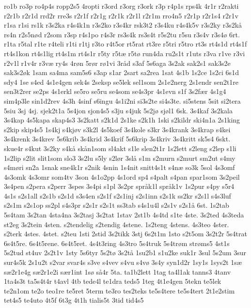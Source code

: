 {ro1b
ro3p
ro4p4s
ropp2s5
4ropti
r3ord
r3org
r3ork
r3p
r4p1s
rps4k
4r1r
r2rakti
r2r1b
r2r1d
rrd2r
rre3s
r2r1f
r2r1g
r2r1k
r2r1l
r2r1m
rro4n5
r2r1p
r2r1s4
r2r1v
r1sa
r1si
rs1k
r3s2ka
r4s4k1n
r3s2ko
r3s4kr
rsk3t2
r3s4ku
r4s4k5v
r3s2ky
r3s2k^^e5
rs4n
r2s5n^^f8d
r2som
r3sp
r4s1po
r4s3r
rs3s4k
rs3s4t
r5s2tu
r5su
r3s4v
r3s4^^f8
6rt.
r1ta
r5tal
r1te
r4teli
r1ti
r1tj
r3to
r4t5or
rt5rat
rt3re
r5tri
r5tro
rt3s
rt4s1d
rt4s1f
rt4s1kon
rt4s1lig
rt4s1m
rt4s1r
r5ty
r5t^^e6
r5t^^f8
run4da
ru2s1t
r1uts
r3va
r1ve
r3vi
r2v1l
r1v4r
r3v^^e6
ry4s
4r^^f8n
5r^^f8r
r^^f81vi
3r^^e5d
s3af
5s6aga
3s2ak
sak2s1
sak3s2e
sak3s2^^f8k
1sam
sa4ma
sam5s6
s3ap
s1ar
2sart
sa2rea
1sat
4s1b
1s2ce
1s2ci
6s1d
sdy4
1se
s4ed
4s1e4gen
sek4s
2seksp
se5lek
sel1som
2s1e2nerg
2s1endr
sen2t1re
sen3t2rer
se2ps
4s1erkl
se5ro
se5ru
se4som
se4s3pr
4s1evn
s1f
3s2f^^e6r
4s1g4
sim4p3le
sin1d2rev
4s3h
4sinf
s6ingu
4s1i2ni
si3s2te
si4s3te.
si5stens
5sit
si2tera
5siu
3sj
4sj.
sjek2t1a
5s4jon
sjon4s5
s3ju
s4juk
5s2j^^f8
sj^^f8l1
6sk.
3s4kaf
3s2kala
3s4kap
4s5kapa
skap4s3
3s2katt
s2k1d
2s1ke
s2k1h
1ski
s2kildr
ski4n1a
2s1king
s2kip
skip4s5
1s4kj
s4kj^^f8v
s3k2l
4s5koef
3s4kole
s3kr
3s4krank
3s4krap
s4kei
3s4krenk
3s4krev
5s6krib
3s4krid
3s4krif
5s6krip
3s4kriv
3s4kritt
sk5s4
6skt.
skue4r
s4kut
3s2ky
s4k^^e5
sk^^e5n1som
sl4akt
s1le
slen2t1r
1s2lett
s2leng
s2lep
s1li
1s2lip
s2lit
slit1som
slo3
3s2lu
s5ly
s2l^^f8r
3sl^^e5
s1m
s2murn
s2murt
sm2ut
s4my
s4m^^f8ri
sn2a
1snak
sne4k1r
s2nik
4snin
1s4nit
snitt4s1t
s4n^^e6
so3k
5sol
4s3omf
4s3omk
4s3omr
som4tv
3son
4s1o2pp
4s1ord
sp4
s4palt
s4pan
spar1som
3s2peil
3s4pen
s2pera
s2perr
3spes
3s4pi
s1pl
3s2pr
spr^^e5k1l
spr^^e5k1v
1s2pur
s4py
s5r4
4s1s
s2s1all
s2s1b
s2s1d
s3s4en
s2s1f
s2s1inj
s2s1inn
s2s1k
ss2kr
s2s1l
s4s3luf
s2s1m
s2s1op
ss2pl
s4s3pr
s2s1r
s2s1t
ss3tab
s4s1u4l
s2s1v
s2s1^^e5
6st.
1s2tab
5s4tam
3s2tan
4sta4na
3s2tasj
3s2tat
1stav
2st1b
4s4td
s1te
4ste.
3s2ted
4s3teda
st2eg
3s2tein
4sten.
s2tendelig
s2tendig
4stene.
1s2teng
4stens.
4s3teo
4ster.
s2terk
4stes.
4stet.
s2teu
1sti
2stid
3s2tikk
3stj
6s2t1m
1sto
s2t5om
3s2t2r
5s4trat
6s4t5re.
6s4t5rene.
6s4t5ret.
4s4t3ring
4s3tro
5s4truk
5s4tr^^f8m
str^^f8ms5
4st1s
5s2tud
st4uv
2s2t1v
1sty
5s6tyr
5s2t^^f8
3s2t^^e5
1su2b1
s1u2ke
suk1r
3sul
5s2um
3sur
sur4s5k
2s1u2t
s2var
svar4s
s3ve
s4vev
s4vu
s4v^^f8
3s4y
syn1d2r
1sy1s
1sys2t
1s^^e6
s^^e62r1e4g
s^^e62r1e2i
s^^e6r1int
1s^^f8
s^^e54r
5ta.
ta1b2lett
1tag
ta4l1ak
tanns3
4tanv
1ta4s3t
ta5s4t4r
t4avl
4tb
tede4l
te1dra
teds5
1teg
4t1e4gen
5tekn
te5lek
te2n1om
te2o
teo1re
te5ret
5term
te3ro
tes2teks
te5s4tere
te5s4tert
2t1e2stim
tet4s5
te4uto
4t5f
6t3g
4t1h
tialis5t
3tid
tid4s5
}

